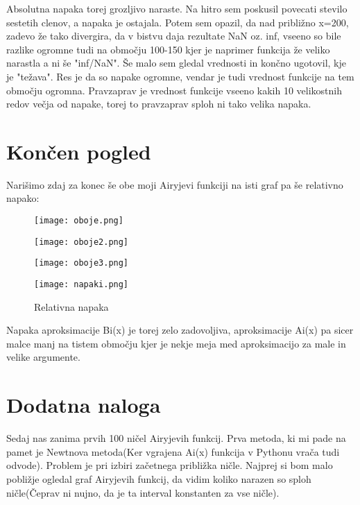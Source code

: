 \documentclass{article}
\begin{document}
Absolutna napaka torej grozljivo naraste. Na hitro sem poskusil povecati stevilo sestetih clenov, a napaka je ostajala. Potem sem opazil, da
nad približno x=200, zadevo že tako divergira, da v bistvu daja rezultate NaN oz. inf, vseeno so bile razlike ogromne tudi na območju 100-150 kjer
je naprimer funkcija že veliko narastla a ni še "inf/NaN".
Še malo sem gledal vrednosti in končno ugotovil, kje je "težava". Res je da so napake ogromne, vendar je tudi vrednost funkcije na tem območju ogromna. Pravzaprav je vrednost funkcije vseeno kakih 10 velikostnih redov večja od napake, torej to pravzaprav sploh ni tako velika napaka.

\section{Končen pogled}

Narišimo zdaj za konec še obe moji Airyjevi funkciji na isti graf pa še relativno napako:

\begin{figure}[H]
\texttt{[image: oboje.png]}
\end{figure}

\begin{figure}[H]
\texttt{[image: oboje2.png]}
\end{figure}

\begin{figure}[H]
\texttt{[image: oboje3.png]}
\end{figure}

\begin{figure}[H]
\texttt{[image: napaki.png]}
\caption*{Relativna napaka}
\end{figure}

Napaka aproksimacije Bi(x) je torej zelo zadovoljiva, aproksimacije Ai(x) pa sicer malce manj na tistem območju kjer je nekje meja med aproksimacijo za male in velike argumente.
\newpage
\section{Dodatna naloga}

Sedaj nas zanima prvih 100 ničel Airyjevih funkcij. Prva metoda, ki mi pade na pamet je Newtnova metoda(Ker vgrajena Ai(x) funkcija v Pythonu vrača tudi odvode). Problem je pri izbiri začetnega približka ničle. Najprej si bom malo pobližje ogledal graf Airyjevih funkcij, da vidim koliko narazen so sploh ničle(Čeprav ni nujno, da je ta interval konstanten za vse ničle).
\end{document}
